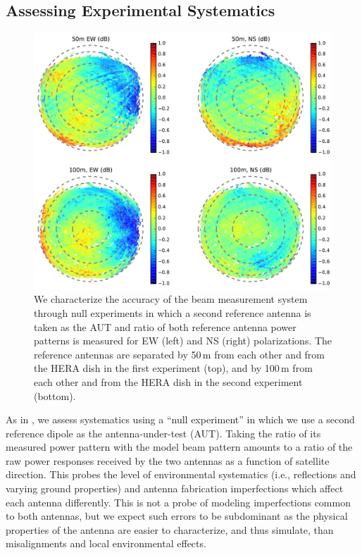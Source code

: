 \documentclass{emulateapj}
\begin{document}
\subsection{Assessing Experimental Systematics}

\begin{figure}[h]
\centering
\includegraphics[width=6.5in]{null_expt_rel_beam_maps.pdf}
\caption{We characterize the accuracy of the beam measurement system through null experiments in which a second reference antenna is taken as the AUT and ratio of both reference antenna power patterns is measured for EW (left) and NS (right) polarizations. The reference antennas are separated by 50\,m from each other and from the HERA dish in the first experiment (top), and by 100\,m from each other and from the HERA dish in the second experiment (bottom).}
\label{fig:nullexptplots}
\end{figure}

As in \citet{neben15}, we assess systematics using a ``null experiment'' in which we use a second reference dipole as the antenna-under-test (AUT). Taking the ratio of its measured power pattern with the model beam pattern amounts to a ratio of the raw power responses received by the two antennas as a function of satellite direction. This probes the level of environmental systematics (i.e., reflections and varying ground properties) and antenna fabrication imperfections which affect each antenna differently. This is not a probe of modeling imperfections common to both antennas, but we expect such errors to be subdominant as the physical properties of the antenna are easier to characterize, and thus simulate, than misalignments and local environmental effects. 
\end{document}
